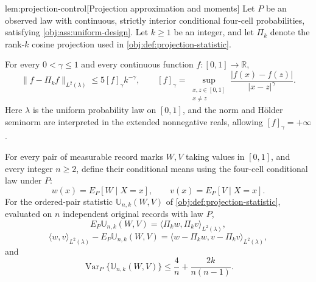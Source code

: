 \documentclass[11pt]{article}
\begin{document}
\begin{lemmav}{lem:projection-control}[Projection approximation and moments]
Let \(P\) be an observed law with continuous, strictly interior conditional four-cell probabilities, satisfying \cref{obj:ass:uniform-design}. Let \(k\ge1\) be an integer, and let \(\Pi_k\) denote the rank-\(k\) cosine projection used in \cref{obj:def:projection-statistic}.

For every \(0<\gamma\le1\) and every continuous function \(f:[0,1]\to\mathbb R\),
\[
\|f-\Pi_k f\|_{L^2(\lambda)}
\le 5[f]_\gamma k^{-\gamma},
\qquad
[f]_\gamma
=
\sup_{\substack{x,z\in[0,1]\\x\ne z}}
\frac{|f(x)-f(z)|}{|x-z|^\gamma}.
\]
Here \(\lambda\) is the uniform probability law on \([0,1]\), and the norm and Hölder seminorm are interpreted in the extended nonnegative reals, allowing \([f]_\gamma=+\infty\).

For every pair of measurable record marks \(W,V\) taking values in \([0,1]\), and every integer \(n\ge2\), define their conditional means using the four-cell conditional law under \(P\):
\[
w(x)=E_P[W\mid X=x],
\qquad
v(x)=E_P[V\mid X=x].
\]
For the ordered-pair statistic \(\mathbb U_{n,k}(W,V)\) of \cref{obj:def:projection-statistic}, evaluated on \(n\) independent original records with law \(P\),
\[
E_P\mathbb U_{n,k}(W,V)
=
\langle\Pi_k w,\Pi_k v\rangle_{L^2(\lambda)},
\]
\[
\langle w,v\rangle_{L^2(\lambda)}
-
E_P\mathbb U_{n,k}(W,V)
=
\langle w-\Pi_k w,v-\Pi_k v\rangle_{L^2(\lambda)},
\]
and
\[
\operatorname{Var}_P\{\mathbb U_{n,k}(W,V)\}
\le
\frac4n+\frac{2k}{n(n-1)}.
\]
\end{lemmav}
\end{document}
